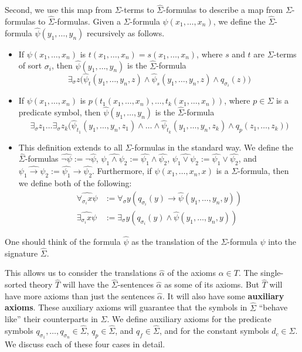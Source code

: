 Second, we use this map from $\Sigma$-terms to
$\widehat{\Sigma}$-formulas to describe a map from $\Sigma$-formulas
to $\widehat{\Sigma}$-formulas.  Given a $\Sigma$-formula
$\psi(x_1,\ldots, x_n)$, we define the $\widehat{\Sigma}$-formula
$\widehat{\psi}(y_1,\ldots, y_n)$ recursively as follows.
\begin{itemize}
\item If $\psi(x_1,\ldots, x_n)$ is $t(x_1,\ldots, x_n)=s(x_1,\ldots, x_n)$, where $s$ and $t$ are $\Sigma$-terms of sort $\sigma_i$, then $\widehat{\psi}(y_1,\ldots, y_n)$ is the $\widehat{\Sigma}$-formula 
$$
\exists_\sigma z\big(\widehat{\psi}_{t}(y_1,\ldots, y_n, z)\land
\widehat{\psi}_{s}(y_1,\ldots, y_n, z)\land q_{\sigma_i}(z)\big)
$$
\item If $\psi(x_1,\ldots, x_n)$ is $p(t_1(x_1,\ldots, x_n),\ldots,
  t_k(x_1,\ldots, x_n))$, where $p\in\Sigma$ is a predicate symbol,
  then $\widehat{\psi}(y_1,\ldots, y_n)$ is the
  $\widehat{\Sigma}$-formula
$$
\exists_\sigma z_1\ldots \exists_\sigma
z_k\big(\widehat{\psi}_{t_1}(y_1,\ldots, y_n,
z_1)\land\ldots\land\widehat{\psi}_{t_k}(y_1,\ldots, y_n, z_k)\land
q_{p}(z_1,\ldots, z_k)\big)
$$
\item This definition extends to all $\Sigma$-formulas in the standard
  way. We define the $\widehat{\Sigma}$-formulas
  $\widehat{\lnot\psi}:=\lnot\widehat{\psi}$,
  $\widehat{\psi_1\land\psi_2}:=\widehat{\psi_1}\land\widehat{\psi_2}$,
  $\widehat{\psi_1\lor\psi_2}:=\widehat{\psi_1}\lor\widehat{\psi_2}$,
  and
  $\widehat{\psi_1\rightarrow\psi_2}:=\widehat{\psi_1}\rightarrow\widehat{\psi_2}$. Furthermore,
  if $\psi(x_1,\ldots, x_n, x)$ is a $\Sigma$-formula, then we define
  both of the following:
\begin{align*}
\widehat{\forall_{\sigma_i} x \psi}&:=\forall_\sigma y(q_{\sigma_i}(y)\rightarrow \widehat{\psi}(y_1,\ldots, y_n, y))\\
\widehat{\exists_{\sigma_i} x\psi}&:=\exists_\sigma y(q_{\sigma_i}(y)\land\widehat{\psi}(y_1,\ldots, y_n, y))
\end{align*}
\end{itemize}
One should think of the formula $\widehat{\psi}$ as the translation of
the $\Sigma$-formula $\psi$ into the signature $\widehat{\Sigma}$.

This allows us to consider the translations $\widehat{\alpha}$ of the
axioms $\alpha\in T$. The single-sorted theory $\widehat{T}$ will have
the $\widehat{\Sigma}$-sentences $\widehat{\alpha}$ as some of its
axioms. But $\widehat{T}$ will have more axioms than just the
sentences $\widehat{\alpha}$. It will also have some \textbf{auxiliary
  axioms}. These auxiliary axioms will guarantee that the symbols in
$\widehat{\Sigma}$ ``behave like'' their counterparts in $\Sigma$. We
define auxiliary axioms for the predicate symbols
$q_{\sigma_1},\ldots, q_{\sigma_n}\in\widehat{\Sigma}$,
$q_{p}\in\widehat{\Sigma}$, and $q_f\in\widehat{\Sigma}$, and for the
constant symbols $d_c\in\widehat{\Sigma}$.  We discuss each of these
four cases in detail.


